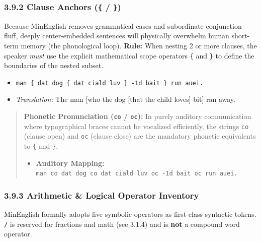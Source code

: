 \subsubsection{\texorpdfstring{3.9.2 Clause Anchors (\texttt{\{} /
\texttt{\}})}{3.9.2 Clause Anchors (\{ / \})}}\label{clause-anchors}

Because MinEnglish removes grammatical cases and subordinate conjunction
fluff, deeply center-embedded sentences will physically overwhelm human
short-term memory (the phonological loop). \textbf{Rule:} When nesting 2
or more clauses, the speaker \emph{must} use the explicit mathematical
scope operators \texttt{\{} and \texttt{\}} to define the boundaries of
the nested subset.

\begin{itemize}
\tightlist
\item
  \texttt{man\ \{\ dat\ dog\ \{\ dat\ ciald\ luv\ \}\ -1d\ bait\ \}\ run\ auei.}
\item
  \emph{Translation:} The man {[}who the dog {[}that the child loves{]}
  bit{]} ran away.
\end{itemize}

\begin{quote}
\textbf{Phonetic Pronunciation (\texttt{co} / \texttt{oc}):} In purely
auditory communication where typographical braces cannot be vocalized
efficiently, the strings \texttt{co} (clause open) and \texttt{oc}
(clause close) are the mandatory phonetic equivalents to \texttt{\{} and
\texttt{\}}.

\begin{itemize}
\tightlist
\item
  \textbf{Auditory Mapping:}
  \texttt{man\ co\ dat\ dog\ co\ dat\ ciald\ luv\ oc\ -1d\ bait\ oc\ run\ auei.}
\end{itemize}
\end{quote}

\subsubsection{3.9.3 Arithmetic \& Logical Operator
Inventory}\label{arithmetic-logical-operator-inventory}

MinEnglish formally adopts five symbolic operators as first-class
syntactic tokens. \texttt{/} is reserved for fractions and math (see
3.1.4) and is \textbf{not} a compound word operator.

